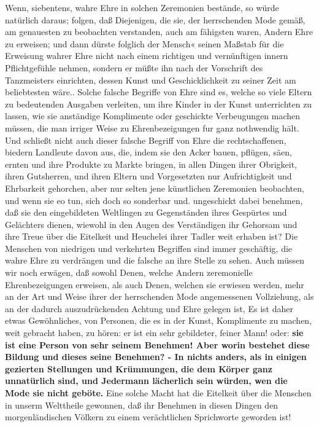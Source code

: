 Wenn, siebentens, wahre Ehre in solchen Zeremonien bestände, so würde natürlich
daraus; folgen, daß Diejenigen, die sie, der herrschenden Mode gemäß, am
genauesten zu beobachten verstanden, auch am fähigsten waren, Andern Ehre zu
erweisen; und dann dürste folglich der Mensch« seinen Maßstab für die Erweisung
wahrer Ehre nicht nach einem richtigen und vernünftigen innern Pflichtgefühle
nehmen, sondern er müßte ihn nach der Vorschrift des Tanzmeisters einrichten,
dessen Kunst und Geschicklichkeit zu seiner Zeit am beliebtesten wäre.. Solche
falsche Begriffe von Ehre sind es, welche so viele Eltern zu bedeutenden
Ausgaben verleiten, um ihre Kinder in der Kunst unterrichten zu lassen, wie sie
anständige Komplimente oder geschickte Verbeugungen machen müssen, die man
irriger Weise zu Ehrenbezeigungen fur ganz nothwendig hält. Und schließt nicht
auch dieser falsche Begriff von Ehre die rechtschaffenen, biedern Landleute
davon aus, die, indem sie den Acker bauen, pflügen, säen, ernten und ihre
Produkte zu Markte bringen, in allen Dingen ihrer Obrigkeit, ihren Gutsherren,
und ihren Eltern und Vorgesetzten nur Aufrichtigkeit und Ehrbarkeit gehorchen,
aber nur selten jene künstlichen Zeremonien beobachten, und wenn sie eo tun,
sich doch so sonderbar und. ungeschickt dabei benehmen, daß sie den
eingebildeten Weltlingen zu Gegenständen ihres Gespürtes und Gelächters dienen,
wiewohl in den Augen des Verständigen ihr Gehorsam und ihre Treue über die
Eitelkeit und Heuchelei ihrer Tadler weit erhaben ist? Die Menschen von
niedrigen und verkehrten Begriffen sind immer geschäftig, die wahre Ehre zu
verdrängen und die falsche an ihre Stelle zu sehen. Auch müssen wir noch
erwägen, daß sowohl Denen, welche Andern zeremonielle Ehrenbezeigungen erweisen,
als auch Denen, welchen sie erwiesen werden, mehr an der Art und Weise ihrer der
herrschenden Mode angemessenen Vollziehung, als an der dadurch auszudrückenden
Achtung und Ehre gelegen ist, Es ist daher etwas Gewöhnliches, von Personen, die
es in der Kunst, Komplimente zu machen, weit gebracht haben, zu hören: er ist
ein sehr gebildeter, feiner Mann! oder: \textbf{sie ist eine Person von sehr seinem
Benehmen! Aber worin bestehet diese Bildung und dieses seine Benehmen? - In
nichts anders, als in einigen gezierten Stellungen und Krümmungen, die dem
Körper ganz unnatürlich sind, und Jedermann lächerlich sein würden, wen die Mode
sie nicht geböte.} Eine solche Macht hat die Eitelkeit über die Menschen in
unserm Welttheile gewonnen, daß ihr Benehmen in diesen Dingen den
morgenländischen Völkern zu einem verächtlichen Sprichworte geworden ist!

